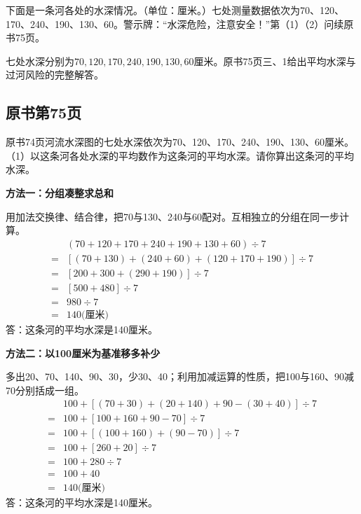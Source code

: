下面是一条河各处的水深情况。（单位：厘米。）七处测量数据依次为70、120、170、240、190、130、60。警示牌：“水深危险，注意安全！”第（1）（2）问续原书75页。\par
{}
\begin{BookAnswer}
七处水深分别为\(70,120,170,240,190,130,60\)厘米。原书75页三、1给出平均水深与过河风险的完整解答。
\end{BookAnswer}



\subsection*{原书第75页}

原书74页河流水深图的七处水深依次为70、120、170、240、190、130、60厘米。（1）以这条河各处水深的平均数作为这条河的平均水深。请你算出这条河的平均水深。\par
\begin{BookAnswer}
\textbf{方法一：分组凑整求总和}\par 用加法交换律、结合律，把70与130、240与60配对。互相独立的分组在同一步计算。\[\begin{aligned}&(70+120+170+240+190+130+60)\div7\\={}&[(70+130)+(240+60)+(120+170+190)]\div7\\={}&[200+300+(290+190)]\div7\\={}&[500+480]\div7\\={}&980\div7\\={}&140\text{(厘米)}\end{aligned}\]答：这条河的平均水深是140厘米。\par\textbf{方法二：以100厘米为基准移多补少}\par 多出20、70、140、90、30，少30、40；利用加减运算的性质，把100与160、90减70分别括成一组。\[\begin{aligned}&100+[(70+30)+(20+140)+90-(30+40)]\div7\\={}&100+[100+160+90-70]\div7\\={}&100+[(100+160)+(90-70)]\div7\\={}&100+[260+20]\div7\\={}&100+280\div7\\={}&100+40\\={}&140\text{(厘米)}\end{aligned}\]答：这条河的平均水深是140厘米。
\end{BookAnswer}

